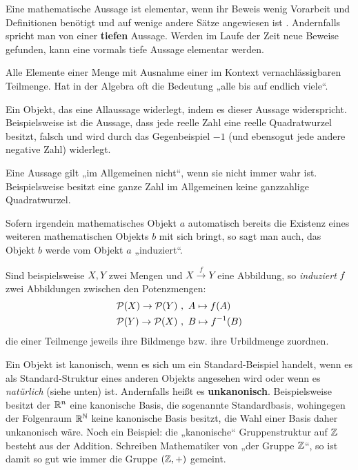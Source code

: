 \begin{description}[labelindent=0pt, leftmargin=0pt]
    \item[Elementar:] Eine mathematische Aussage ist elementar, wenn ihr Beweis wenig Vorarbeit und Definitionen benötigt und auf wenige andere Sätze angewiesen ist . Andernfalls spricht man von einer \textbf{tiefen} Aussage. Werden im Laufe der Zeit neue Beweise gefunden, kann eine vormals tiefe Aussage elementar werden.

    \item[Fast alle:] Alle Elemente einer Menge mit Ausnahme einer im Kontext vernachlässigbaren Teilmenge. Hat in der Algebra oft die Bedeutung „alle bis auf endlich viele“.

    \item[Gegenbeispiel:] Ein Objekt, das eine Allaussage widerlegt, indem es dieser Aussage widerspricht. Beispielsweise ist die Aussage, dass jede reelle Zahl eine reelle Quadratwurzel besitzt, falsch und wird durch das Gegenbeispiel $-1$ (und ebensogut jede andere negative Zahl) widerlegt.

    \item[Im Allgemeinen nicht:] Eine Aussage gilt „im Allgemeinen nicht“, wenn sie nicht immer wahr ist. Beispielsweise besitzt eine ganze Zahl im Allgemeinen keine ganzzahlige Quadratwurzel.
    
    \item[Induzieren:]  Sofern irgendein mathematisches Objekt $a$ automatisch bereits die Existenz eines weiteren mathematischen Objekts $b$ mit sich bringt, so sagt man auch, das Objekt $b$ werde vom Objekt $a$ „induziert“.

    Sind beispielsweise $X,Y$ zwei Mengen und $X\xrightarrow{f} Y$ eine Abbildung, so \emph{induziert} $f$ zwei Abbildungen zwischen den Potenzmengen:
    \begin{align*}
        \mathcal P(X) \to \mathcal P(Y) \ & , \ A\mapsto f(A) \\
            \mathcal P(Y) \to \mathcal P(X) \ & , \ B\mapsto f^{-1}(B)
    \end{align*}
    die einer Teilmenge jeweils ihre Bildmenge bzw. ihre Urbildmenge zuordnen.
    
    \item[Kanonisch:]  Ein Objekt ist kanonisch, wenn es sich um ein Standard-Beispiel handelt, wenn es als Standard-Struktur eines anderen Objekts angesehen wird oder wenn es \emph{natürlich} (siehe unten) ist. Andernfalls heißt es \textbf{unkanonisch}. Beispielsweise besitzt der $\mathbb R^n$ eine kanonische Basis, die sogenannte Standardbasis, wohingegen der Folgenraum $\mathbb R^\mathbb N$ keine kanonische Basis besitzt, die Wahl einer Basis daher unkanonisch wäre. Noch ein Beispiel: die „kanonische“ Gruppenstruktur auf $\mathbb Z$ besteht aus der Addition. Schreiben Mathematiker von „der Gruppe $\mathbb Z$“, so ist damit so gut wie immer die Gruppe $(\mathbb Z,+)$ gemeint.


\end{description}
